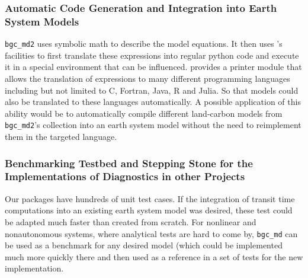 \subsubsection{Automatic Code Generation and Integration into Earth System Models}
\texttt{bgc\_md2} uses symbolic math to describe the model equations. It then
uses \sympy{}'s facilities to first translate these expressions into regular python code and execute it in a special environment that can be influenced.
\sympy{}
provides a printer module that allows the translation of \sympy{} 
expressions to many different programming languages including but not limited to C, Fortran, Java, R and Julia.
So that models could also be translated to these languages automatically. 
A possible application of this ability would be to automatically compile different land-carbon models from \texttt{bgc\_md2}'s collection into an earth system model without the need to reimplement them in the targeted language. 
\subsubsection{Benchmarking Testbed and Stepping Stone for the Implementations of Diagnostics in other Projects}
Our packages have hundreds of unit test cases. If the integration of transit time computations into an existing earth system model was desired, these test could be adapted
much faster than created from scratch. For nonlinear and nonautonomous systems, where analytical tests are hard to come by, \texttt{bgc\_md} can be used as a benchmark for any desired model (which could be implemented much more quickly there and then used as a reference in a set of tests for the new implementation.
